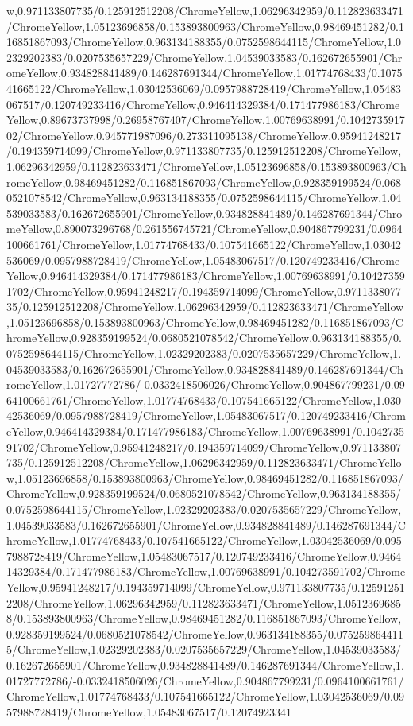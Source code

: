 {\begin{tikzternal}
{w,0.971133807735/0.125912512208/ChromeYellow,1.06296342959/0.112823633471/ChromeYellow,1.05123696858/0.153893800963/ChromeYellow,0.98469451282/0.116851867093/ChromeYellow,0.963134188355/0.0752598644115/ChromeYellow,1.02329202383/0.0207535657229/ChromeYellow,1.04539033583/0.162672655901/ChromeYellow,0.934828841489/0.146287691344/ChromeYellow,1.01774768433/0.107541665122/ChromeYellow,1.03042536069/0.0957988728419/ChromeYellow,1.05483067517/0.120749233416/ChromeYellow,0.946414329384/0.171477986183/ChromeYellow,0.89673737998/0.26958767407/ChromeYellow,1.00769638991/0.104273591702/ChromeYellow,0.945771987096/0.273311095138/ChromeYellow,0.95941248217/0.194359714099/ChromeYellow,0.971133807735/0.125912512208/ChromeYellow,1.06296342959/0.112823633471/ChromeYellow,1.05123696858/0.153893800963/ChromeYellow,0.98469451282/0.116851867093/ChromeYellow,0.928359199524/0.0680521078542/ChromeYellow,0.963134188355/0.0752598644115/ChromeYellow,1.04539033583/0.162672655901/ChromeYellow,0.934828841489/0.146287691344/ChromeYellow,0.890073296768/0.261556745721/ChromeYellow,0.904867799231/0.0964100661761/ChromeYellow,1.01774768433/0.107541665122/ChromeYellow,1.03042536069/0.0957988728419/ChromeYellow,1.05483067517/0.120749233416/ChromeYellow,0.946414329384/0.171477986183/ChromeYellow,1.00769638991/0.104273591702/ChromeYellow,0.95941248217/0.194359714099/ChromeYellow,0.971133807735/0.125912512208/ChromeYellow,1.06296342959/0.112823633471/ChromeYellow,1.05123696858/0.153893800963/ChromeYellow,0.98469451282/0.116851867093/ChromeYellow,0.928359199524/0.0680521078542/ChromeYellow,0.963134188355/0.0752598644115/ChromeYellow,1.02329202383/0.0207535657229/ChromeYellow,1.04539033583/0.162672655901/ChromeYellow,0.934828841489/0.146287691344/ChromeYellow,1.01727772786/-0.0332418506026/ChromeYellow,0.904867799231/0.0964100661761/ChromeYellow,1.01774768433/0.107541665122/ChromeYellow,1.03042536069/0.0957988728419/ChromeYellow,1.05483067517/0.120749233416/ChromeYellow,0.946414329384/0.171477986183/ChromeYellow,1.00769638991/0.104273591702/ChromeYellow,0.95941248217/0.194359714099/ChromeYellow,0.971133807735/0.125912512208/ChromeYellow,1.06296342959/0.112823633471/ChromeYellow,1.05123696858/0.153893800963/ChromeYellow,0.98469451282/0.116851867093/ChromeYellow,0.928359199524/0.0680521078542/ChromeYellow,0.963134188355/0.0752598644115/ChromeYellow,1.02329202383/0.0207535657229/ChromeYellow,1.04539033583/0.162672655901/ChromeYellow,0.934828841489/0.146287691344/ChromeYellow,1.01774768433/0.107541665122/ChromeYellow,1.03042536069/0.0957988728419/ChromeYellow,1.05483067517/0.120749233416/ChromeYellow,0.946414329384/0.171477986183/ChromeYellow,1.00769638991/0.104273591702/ChromeYellow,0.95941248217/0.194359714099/ChromeYellow,0.971133807735/0.125912512208/ChromeYellow,1.06296342959/0.112823633471/ChromeYellow,1.05123696858/0.153893800963/ChromeYellow,0.98469451282/0.116851867093/ChromeYellow,0.928359199524/0.0680521078542/ChromeYellow,0.963134188355/0.0752598644115/ChromeYellow,1.02329202383/0.0207535657229/ChromeYellow,1.04539033583/0.162672655901/ChromeYellow,0.934828841489/0.146287691344/ChromeYellow,1.01727772786/-0.0332418506026/ChromeYellow,0.904867799231/0.0964100661761/ChromeYellow,1.01774768433/0.107541665122/ChromeYellow,1.03042536069/0.0957988728419/ChromeYellow,1.05483067517/0.12074923341}
\end{tikzternal}}
